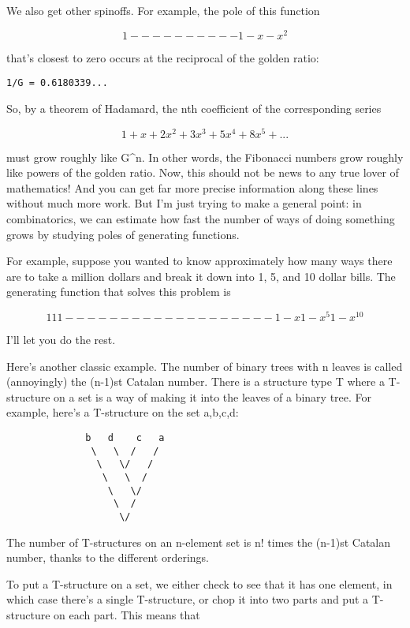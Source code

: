 We also get other spinoffs.  For example, the pole of this function

$$
     1
 ---------- 
 1 - x - x^{2}
$$
    
that's closest to zero occurs at the reciprocal of the golden ratio:

\begin{verbatim}
1/G = 0.6180339...
\end{verbatim}
    
So, by a theorem of Hadamard, the nth coefficient of the corresponding
series

$$
1 + x + 2x^{2} + 3x^{3} + 5x^{4} + 8x^{5} + ...
$$
    
must grow roughly like G^{n}.  In other words, the Fibonacci numbers grow
roughly like powers of the golden ratio.  Now, this should not be news
to any true lover of mathematics!  And you can get far more precise
information along these lines without much more work.  But I'm just
trying to make a general point: in combinatorics, we can estimate how
fast the number of ways of doing something grows by studying poles of
generating functions.

For example, suppose you wanted to know approximately how many ways
there are to take a million dollars and break it down into 1, 5, and
10 dollar bills.  The generating function that solves this problem is

$$
           1       1         1
         ------  ------   -------
         1 - x   1 - x^{5}   1 - x^{10}
$$
    
I'll let you do the rest.  

Here's another classic example.  The number of binary trees with n leaves 
is called (annoyingly) the (n-1)st Catalan number.  There is a structure
type T where a T-structure on a set is a way of making it into the
leaves of a binary tree.  For example, here's a T-structure on the set
{a,b,c,d}:

\begin{verbatim}
              b   d    c   a
               \   \  /   /
                \   \/   /
                 \   \  /           
                  \   \/
                   \  /
                    \/
\end{verbatim}
    
The number of T-structures on an n-element set is n! times the
(n-1)st Catalan number, thanks to the different orderings.

To put a T-structure on a set, we either check to see that it has one
element, in which case there's a single T-structure, or chop it into
two parts and put a T-structure on each part.  This means that

